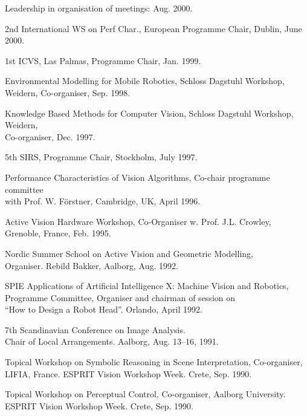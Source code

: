 \documentclass{article}
\begin{document}
\begin{cv}
\begin{cvlist}{Leadership in organisation of meetings:}
  \cftdotfill{\cftdotsep} Aug. 2000.
\item 2nd International WS on Perf Char., European Programme Chair,
  Dublin,\cftdotfill{\cftdotsep} June 2000.
\item 1st ICVS, Las Palmas, Programme Chair, \cftdotfill{\cftdotsep}
  Jan. 1999.
\item Environmental Modelling for Mobile Robotics, Schloss Dagstuhl
  Workshop,\\ Weidern, Co-organiser, \cftdotfill{\cftdotsep}
  Sep. 1998.
\item Knowledge Based Methods for Computer Vision, Schloss Dagstuhl
  Workshop, Weidern,\\ Co-organiser, \cftdotfill{\cftdotsep}
  Dec. 1997.
\item 5th SIRS, Programme Chair, Stockholm, \cftdotfill{\cftdotsep}
  July 1997.
\item Performance Characteristics of Vision Algorithms, Co-chair
  programme committee\\ with Prof. W. F\"orstner, Cambridge, UK,
  \cftdotfill{\cftdotsep} April 1996.
\item Active Vision Hardware Workshop, Co-Organiser w. Prof. J.L.
  Crowley, \\Grenoble, France,\cftdotfill{\cftdotsep} Feb. 1995.
\item Nordic Summer School on Active Vision and Geometric Modelling,
  \\ Organiser. Rebild Bakker, Aalborg, \cftdotfill{\cftdotsep}
  Aug. 1992.
\item SPIE Applications of Artificial Intelligence X: Machine Vision
  and Robotics, \\ Programme Committee, Organiser and chairman of
  session on\\ ``How to Design a Robot Head''. Orlando,
  \cftdotfill{\cftdotsep} April 1992.
\item 7th Scandinavian Conference on Image Analysis. \\Chair of Local
  Arrangements. Aalborg, \cftdotfill{\cftdotsep} Aug. 13--16, 1991.
\item Topical Workshop on Symbolic Reasoning in Scene Interpretation,
  Co-organiser, \\LIFIA, France.  ESPRIT Vision Workshop Week. Crete,
  \cftdotfill{\cftdotsep} Sep. 1990.
\item Topical Workshop on Perceptual Control, Co-organiser, Aalborg
  University. \\ ESPRIT Vision Workshop Week.  Crete,
  \cftdotfill{\cftdotsep} Sep. 1990.

\end{cvlist}
\end{cv}
\end{document}
